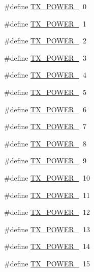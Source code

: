\begin{DoxyCompactItemize}
$$\#define \hyperlink{group__REGION_gab33618449f2a573142c463ab071ef8ed}{T\+X\+\_\+\+P\+O\+W\+E\+R\+\_}~0
\item 
\#define \hyperlink{group__REGION_gaac7fe73d03d0e880cc4c7a3d30e23cb6}{T\+X\+\_\+\+P\+O\+W\+E\+R\+\_}~1
\item 
\#define \hyperlink{group__REGION_gaf308ada92d6393ca5ae171ffc462c74c}{T\+X\+\_\+\+P\+O\+W\+E\+R\+\_}~2
\item 
\#define \hyperlink{group__REGION_ga9d5bc42aaace47b7053ecf685153bdaa}{T\+X\+\_\+\+P\+O\+W\+E\+R\+\_}~3
\item 
\#define \hyperlink{group__REGION_ga36456baf8ace3e7d7ae730ddb54b95bc}{T\+X\+\_\+\+P\+O\+W\+E\+R\+\_}~4
\item 
\#define \hyperlink{group__REGION_ga0149d52581db80901b5bc1adf0aedd1d}{T\+X\+\_\+\+P\+O\+W\+E\+R\+\_}~5
\item 
\#define \hyperlink{group__REGION_ga29743296a1bb29534ecc4894967c0714}{T\+X\+\_\+\+P\+O\+W\+E\+R\+\_}~6
\item 
\#define \hyperlink{group__REGION_ga3c7bd9a98f0c1e7e9aaa90857c4bd700}{T\+X\+\_\+\+P\+O\+W\+E\+R\+\_}~7
\item 
\#define \hyperlink{group__REGION_ga99ec65aa5375a9dbbaf2faac8d7f6968}{T\+X\+\_\+\+P\+O\+W\+E\+R\+\_}~8
\item 
\#define \hyperlink{group__REGION_gacf5b8e09a82ae407ae0ab2d81f1e0c3d}{T\+X\+\_\+\+P\+O\+W\+E\+R\+\_}~9
\item 
\#define \hyperlink{group__REGION_gac9747c69350f34d485c3134e5a57655b}{T\+X\+\_\+\+P\+O\+W\+E\+R\+\_}~10
\item 
\#define \hyperlink{group__REGION_ga739bc82fae779702381bcaa5e85d7d06}{T\+X\+\_\+\+P\+O\+W\+E\+R\+\_}~11
\item 
\#define \hyperlink{group__REGION_gaeeb1b0e98ed14b98b55ce8b7fbd8d3f1}{T\+X\+\_\+\+P\+O\+W\+E\+R\+\_}~12
\item 
\#define \hyperlink{group__REGION_gaabaceca100173cd1f450f53d2e14f0a2}{T\+X\+\_\+\+P\+O\+W\+E\+R\+\_}~13
\item 
\#define \hyperlink{group__REGION_ga6932af7382128090be2a6533e260dd9c}{T\+X\+\_\+\+P\+O\+W\+E\+R\+\_}~14
\item 
\#define \hyperlink{group__REGION_gabe4f87ed0aa6efe21ec76d9a32a334ef}{T\+X\+\_\+\+P\+O\+W\+E\+R\+\_}~15
\end{DoxyCompactItemize}
